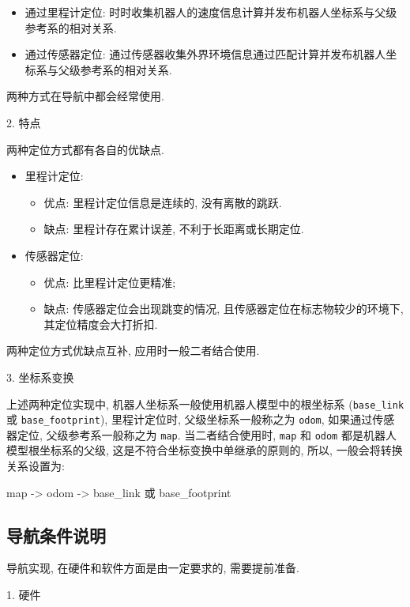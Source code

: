 \documentclass[openany, fontset=windowsold]{ctexbook}
\theoremstyle{kaiti}
\theoremstyle{normal}
\begin{document}
\begin{itemize}
  \item 通过里程计定位: 时时收集机器人的速度信息计算并发布机器人坐标系与父级参考系的相对关系.
  \item 通过传感器定位: 通过传感器收集外界环境信息通过匹配计算并发布机器人坐标系与父级参考系的相对关系.
\end{itemize}

两种方式在导航中都会经常使用.

2. 特点

两种定位方式都有各自的优缺点.

\begin{itemize}
  \item 里程计定位:
  \begin{itemize}
    \item 优点: 里程计定位信息是连续的, 没有离散的跳跃.
    \item 缺点: 里程计存在累计误差, 不利于长距离或长期定位.
  \end{itemize}
  \item 传感器定位:
  \begin{itemize}
    \item 优点: 比里程计定位更精准; 
    \item 缺点: 传感器定位会出现跳变的情况, 且传感器定位在标志物较少的环境下, 其定位精度会大打折扣.
  \end{itemize}
\end{itemize}

两种定位方式优缺点互补, 应用时一般二者结合使用.

3. 坐标系变换

上述两种定位实现中, 机器人坐标系一般使用机器人模型中的根坐标系 (\verb|base_link| 或 \verb|base_footprint|), 里程计定位时, 父级坐标系一般称之为 \verb|odom|, 如果通过传感器定位, 父级参考系一般称之为 \verb|map|. 当二者结合使用时, \verb|map| 和 \verb|odom| 都是机器人模型根坐标系的父级, 这是不符合坐标变换中单继承的原则的, 所以, 一般会将转换关系设置为:

\begin{bash}
  map -> odom -> base_link 或 base_footprint
\end{bash}

\subsection{导航条件说明}

导航实现, 在硬件和软件方面是由一定要求的, 需要提前准备.

1. 硬件
\end{document}
